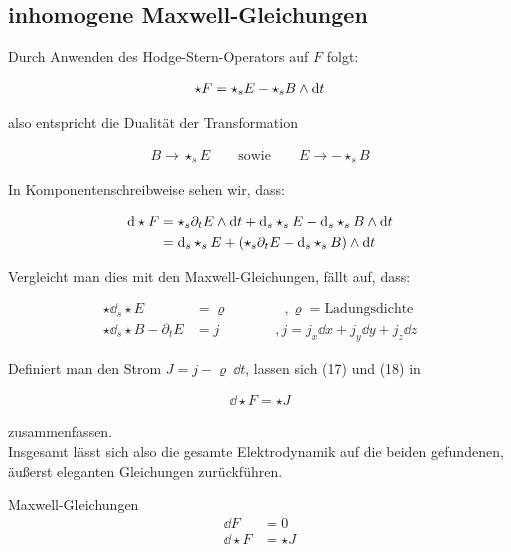 \subsection{inhomogene Maxwell-Gleichungen}
Durch Anwenden des Hodge-Stern-Operators auf $F$ folgt:

\begin{align}
\star F = \star_s E - \star_s B \wedge \dd t 
\end{align}

also entspricht die Dualität der Transformation 

\begin{align*}
B \rightarrow \star_s E \qquad \text{sowie} \qquad E \rightarrow - \star_s B
\end{align*}

In Komponentenschreibweise sehen wir, dass:




\begin{align}
\dd \star F &= \star_s \partial_t E  \wedge \dd t + \dd_s \star_s E - \dd_s \star_s B \wedge \dd t \notag \\
				&= \dd_s \star_s E + (\star_s \partial_t E - \dd_s \star_s B) \wedge \dd t 
\end{align}

Vergleicht man dies mit den Maxwell-Gleichungen, fällt auf, dass:

\begin{align}
\star \dd_s \star E &= \varrho \qquad\qquad,\varrho=\text{Ladungsdichte} \\
\star \dd_s\star B - \partial_t E &= j \qquad\qquad ,j=j_x \dd x + j_y \dd y + j_z \dd z
\end{align}

Definiert man den Strom $J=j - \varrho \  \dd t$, lassen sich (17) und (18) in 

\begin{align}
\dd \star F = \star J
\end{align}

zusammenfassen. \\

Insgesamt lässt sich also die gesamte Elektrodynamik auf die beiden gefundenen, äußerst eleganten Gleichungen zurückführen.

\begin{mybox}{Maxwell-Gleichungen}
\begin{align*}
\dd F &= 0 \\
\dd \star F &= \star J
\end{align*}
\end{mybox}
